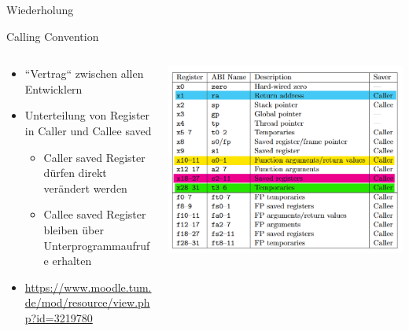 \documentclass[
  german,            %
  aspectratio=169,    %
]{tumbeamer}
\begin{document}
\begin{frame}[c]{}{}
  \begin{center}
    \LARGE  Wiederholung
  \end{center}
\end{frame}

\begin{frame}[c]{Calling Convention}
  \begin{columns}[c]
    \begin{column}{0.5\textwidth}
      \begin{itemize}
        \item ``Vertrag`` zwischen allen Entwicklern
        \item Unterteilung von Register in Caller und Callee saved
        \begin{itemize}
          \item Caller saved Register dürfen direkt verändert werden
          \item Callee saved Register bleiben über Unterprogrammaufrufe erhalten
        \end{itemize} 
        \item \url{https://www.moodle.tum.de/mod/resource/view.php?id=3219780}
      \end{itemize}
    \end{column}
    \begin{column}{0.5\textwidth}
      \includegraphics[width=\linewidth]{w03_calling_conv_regs.png}
    \end{column}
  \end{columns}
\end{frame}
\end{document}
